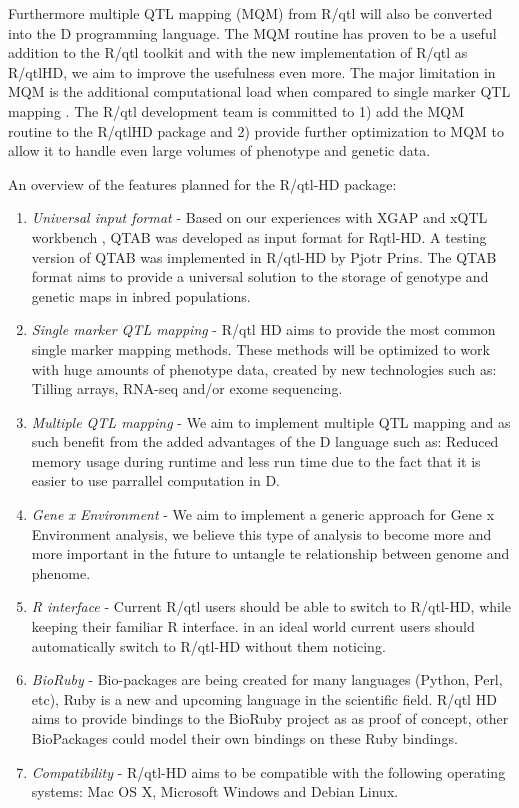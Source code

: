 Furthermore multiple QTL mapping (MQM) from R/qtl will also be converted into the D programming language.
The MQM routine has proven to be a useful addition to the R/qtl toolkit and with the new implementation 
of R/qtl as R/qtlHD, we aim to improve the usefulness even more. The major limitation in MQM is the 
additional computational load when compared to single marker QTL mapping \cite{Arends:2010}. The R/qtl 
development team is committed to 1) add the MQM routine to the R/qtlHD package and 2) provide further 
optimization to MQM to allow it to handle even large volumes of phenotype and genetic data. 

An overview of the features planned for the R/qtl-HD package:
\begin{enumerate}\itemsep1pt
\item \emph{Universal input format} - Based on our experiences with XGAP \cite{Swertz:2010a} and xQTL workbench 
\cite{Arends:2012}, QTAB was developed as input format for Rqtl-HD. A testing version of QTAB was implemented in 
R/qtl-HD by Pjotr Prins. The QTAB format aims to provide a universal solution to the storage of genotype and genetic 
maps in inbred populations.
\item \emph{Single marker QTL mapping} - R/qtl HD aims to provide the most common single marker mapping methods. 
These methods will be optimized to work with huge amounts of phenotype data, created by new technologies such as: 
Tilling arrays, RNA-seq and/or exome sequencing.
\item \emph{Multiple QTL mapping} - We aim to implement multiple QTL mapping and as such benefit from the added 
advantages of the D language such as: Reduced memory usage during runtime and less run time due to the fact that 
it is easier to use parrallel computation in D.
\item \emph{Gene x Environment} - We aim to implement a generic approach for Gene x Environment analysis, we believe 
this type of analysis to become more and more important in the future to untangle te relationship between genome and 
phenome.
\item \emph{R interface} - Current R/qtl users should be able to switch to R/qtl-HD, while keeping their familiar 
R interface. in an ideal world current users should automatically switch to R/qtl-HD without them noticing.
\item \emph{BioRuby} - Bio-packages are being created for many languages (Python, Perl, etc), Ruby is a new and 
upcoming language in the scientific field. R/qtl HD aims to provide bindings to the BioRuby project \cite{Goto:2010} 
as as proof of concept, other BioPackages could model their own bindings on these Ruby bindings.
\item \emph{Compatibility} - R/qtl-HD aims to be compatible with the following operating systems: Mac OS X, 
Microsoft Windows and Debian Linux.
\end{enumerate}

